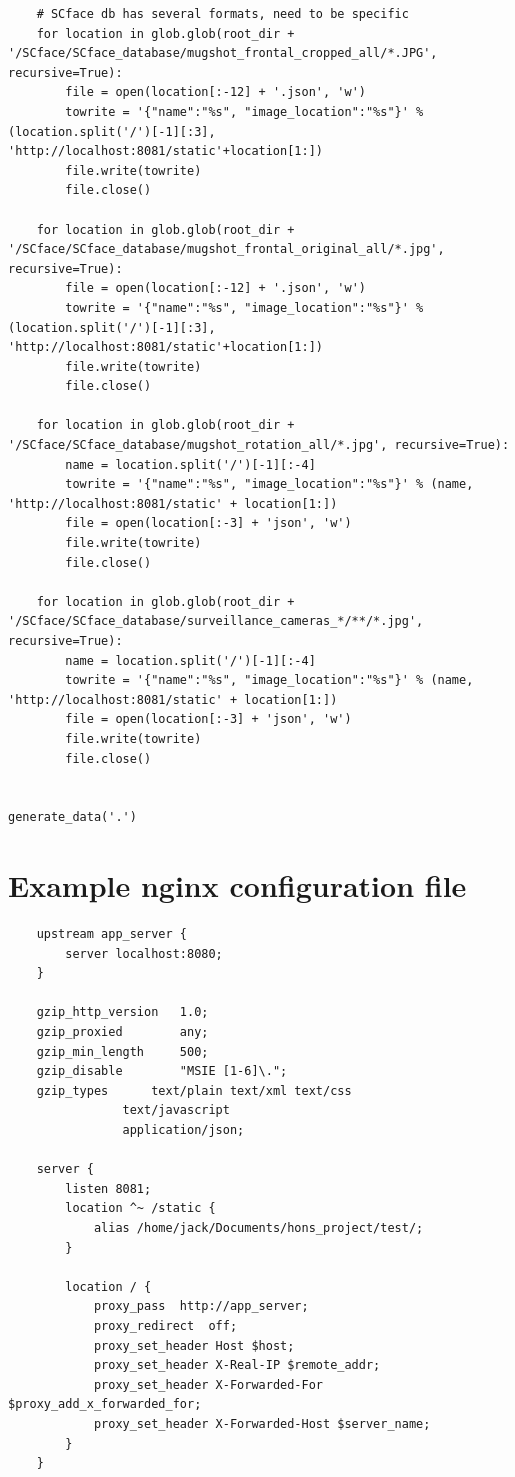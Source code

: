 \documentclass[12pt]{article}
\begin{document}
\begin{appendices}
\begin{lstlisting}
    # SCface db has several formats, need to be specific
    for location in glob.glob(root_dir + '/SCface/SCface_database/mugshot_frontal_cropped_all/*.JPG', recursive=True):
        file = open(location[:-12] + '.json', 'w')
        towrite = '{"name":"%s", "image_location":"%s"}' % (location.split('/')[-1][:3], 'http://localhost:8081/static'+location[1:])
        file.write(towrite)
        file.close()

    for location in glob.glob(root_dir + '/SCface/SCface_database/mugshot_frontal_original_all/*.jpg', recursive=True):
        file = open(location[:-12] + '.json', 'w')
        towrite = '{"name":"%s", "image_location":"%s"}' % (location.split('/')[-1][:3], 'http://localhost:8081/static'+location[1:])
        file.write(towrite)
        file.close()

    for location in glob.glob(root_dir + '/SCface/SCface_database/mugshot_rotation_all/*.jpg', recursive=True):
        name = location.split('/')[-1][:-4]
        towrite = '{"name":"%s", "image_location":"%s"}' % (name, 'http://localhost:8081/static' + location[1:])
        file = open(location[:-3] + 'json', 'w')
        file.write(towrite)
        file.close()

    for location in glob.glob(root_dir + '/SCface/SCface_database/surveillance_cameras_*/**/*.jpg', recursive=True):
        name = location.split('/')[-1][:-4]
        towrite = '{"name":"%s", "image_location":"%s"}' % (name, 'http://localhost:8081/static' + location[1:])
        file = open(location[:-3] + 'json', 'w')
        file.write(towrite)
        file.close()


generate_data('.')
\end{lstlisting}


\section{Example nginx configuration file}
\begin{lstlisting}
	upstream app_server {
		server localhost:8080;
	}

	gzip_http_version	1.0;
	gzip_proxied		any;
	gzip_min_length		500;
	gzip_disable		"MSIE [1-6]\.";
	gzip_types		text/plain text/xml text/css
				text/javascript
				application/json;

	server {
		listen 8081;
		location ^~ /static {
			alias /home/jack/Documents/hons_project/test/;
		}

		location / {
			proxy_pass	http://app_server;
			proxy_redirect	off;
			proxy_set_header Host $host;
			proxy_set_header X-Real-IP $remote_addr;
			proxy_set_header X-Forwarded-For $proxy_add_x_forwarded_for;
			proxy_set_header X-Forwarded-Host $server_name;
		}
	}
\end{lstlisting}
\end{appendices}
\end{document}
